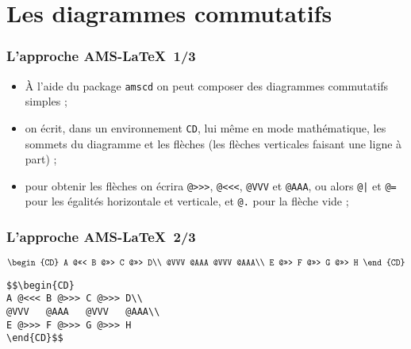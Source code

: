 \section{Les diagrammes commutatifs}

\begin{frame}[fragile]
\frametitle{L'approche AMS-\LaTeX\ 1/3}

\begin{itemize}

\item À l'aide du package \texttt{amscd} on peut composer des diagrammes commutatifs simples ;

\item on écrit, dans un environnement \texttt{CD}, lui même en mode mathématique, les sommets du diagramme et les flèches (les flèches verticales faisant une ligne à part) ;

\item pour obtenir les flèches on écrira \verb=@>>>=, \verb=@<<<=, \verb=@VVV= et \verb=@AAA=, ou alors \verb=@|= et \verb:@=: pour les égalités horizontale et verticale, et \verb=@.= pour la flèche vide ;


\end{itemize}

\end{frame}

\begin{frame}[fragile]
\frametitle{L'approche AMS-\LaTeX\ 2/3}

$$\begin{CD}
A @<<< B @>>> C @>>> D\\
@VVV   @AAA   @VVV   @AAA\\
E @>>> F @>>> G @>>> H
\end{CD}$$

\begin{verbatim}
$$\begin{CD}
A @<<< B @>>> C @>>> D\\
@VVV   @AAA   @VVV   @AAA\\
E @>>> F @>>> G @>>> H
\end{CD}$$
\end{verbatim}

\end{frame}

